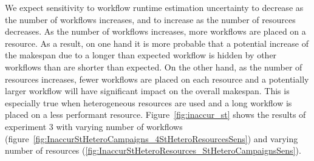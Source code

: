 We expect sensitivity to workflow runtime estimation uncertainty to decrease as
the number of workflows increases, and to increase as the number of resources
decreases. As the number of workflows increases, more workflows are placed on a
resource. As a result, on one hand it is more probable that a potential increase of
the makespan due to a longer than expected workflow is hidden
by other workflows than are shorter than expected. On the other hand, as the
number of resources increases, fewer workflows are placed on each resource and a
potentially larger workflow will have significant impact on the overall
makespan. This is especially true when heterogeneous resources are used and a
long workflow is placed on a less performant resource.
Figure~\ref{fig:inaccur_st} shows the results of experiment 3 with varying
number of workflows (figure~\ref{fig:InaccurStHeteroCampaigns_4StHeteroResourcesSens}) and
varying number of resources (\ref{fig:InaccurStHeteroResources_StHeteroCampaignsSens}).

